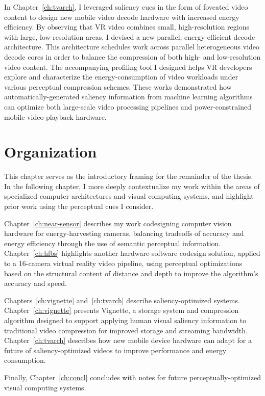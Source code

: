 In Chapter~\ref{ch:tvarch}, I leveraged saliency cues in the form of foveated video content to design new mobile video decode hardware with increased energy efficiency.
By observing that VR video combines small, high-resolution regions with large, low-resolution areas, I devised a new parallel, energy-efficient decode architecture.
This architecture schedules work across parallel heterogeneous video decode cores in order to balance the compression of both high- and low-resolution video content.
The accompanying profiling tool I designed helps VR developers explore and characterize the energy-consumption of video workloads under various perceptual compression schemes.
These works demonstrated how automatically-generated saliency information from machine learning algorithms can optimize both large-scale video processing pipelines and power-constrained mobile video playback hardware.

\section{Organization}
This chapter serves as the introductory framing for the remainder of the thesis.
In the following chapter, I more deeply contextualize my work within the areas of specialized computer architectures and visual computing systems, and highlight prior work using the perceptual cues I consider.

Chapter~\ref{ch:near-sensor} describes my work codesigning computer vision hardware for energy-harvesting cameras, balancing tradeoffs of accuracy and energy efficiency through the use of semantic perceptual information. Chapter~\ref{ch:hfbs} highlights another hardware-software codesign solution, applied to a 16-camera virtual reality video pipeline, using perceptual optimizations based on the structural content of distance and depth to improve the algorithm's accuracy and speed.

Chapters~\ref{ch:vignette} and~\ref{ch:tvarch} describe saliency-optimized systems. Chapter~\ref{ch:vignette} presents Vignette, a storage system and compression algorithm designed to support applying human visual saliency information to traditional video compression for improved storage and streaming bandwidth.
Chapter~\ref{ch:tvarch} describes how new mobile device hardware can adapt for a future of saliency-optimized videos to improve performance and energy consumption.

Finally, Chapter~\ref{ch:concl} concludes with notes for future perceptually-optimized visual computing systems.

